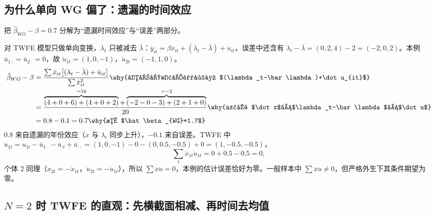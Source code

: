 \subsection{为什么单向 WG 偏了：遗漏的时间效应}

\begin{exmp}[单向 WG 偏误的分解]\label{ex:U10b-wgbias}
把 $\hat\beta_{WG}-\beta=0.7$ 分解为“遗漏时间效应”与“误差”两部分。

\solution 对 TWFE 模型只做单向变换，$\lambda_t$ 只被减去 $\bar\lambda$：$\dot y_{it}=\beta\dot x_{it}+(\lambda_t-\bar\lambda)+\dot u_{it}$，误差中还含有 $\lambda_t-\bar\lambda=(0,2,4)-2=(-2,0,2)$。本例 $\bar u_{1\cdot}=\bar u_{2\cdot}=0$，故 $\dot u_{1t}=(1,0,-1)$，$\dot u_{2t}=(-1,1,0)$。
\begin{align*}
\hat\beta_{WG}-\beta &= \frac{\sum\dot x_{it}\bigl[(\lambda_t-\bar\lambda)+\dot u_{it}\bigr]}{\sum\dot x_{it}^2} \why{单向变换后误差为 $(\lambda_t-\bar\lambda)+\dot u_{it}$}\\
&= \frac{\overbrace{(4+0+6)+(4+0+2)}^{=16}+\overbrace{(-2-0-3)+(2+1+0)}^{=-2}}{20} \why{代入 $\dot x$、$\lambda_t-\bar\lambda$、$\dot u$}\\
&= 0.8-0.1=0.7 \why{故 $\hat\beta_{WG}=1.7$}
\end{align*}
0.8 来自遗漏的年份效应（$x$ 与 $\lambda_t$ 同步上升），$-0.1$ 来自误差。TWFE 中 $\ddot u_{1t}=u_{1t}-\bar u_{1\cdot}-\bar u_{\cdot t}+\bar u_{\cdot\cdot}=(1,0,-1)-0-(0,0.5,-0.5)+0=(1,-0.5,-0.5)$，
\[
\textstyle\sum_t\ddot x_{1t}\ddot u_{1t}=0+0.5-0.5=0,
\]
个体 2 同理（$\ddot x_{2t}=-\ddot x_{1t}$，$\ddot u_{2t}=-\ddot u_{1t}$），所以 $\sum\ddot x\ddot u=0$，本例的估计误差恰好为零。一般样本中 $\sum\ddot x\ddot u\neq0$，但严格外生下其条件期望为零。
\end{exmp}

\subsection{\texorpdfstring{$N=2$}{N=2} 时 TWFE 的直观：先横截面相减、再时间去均值}

